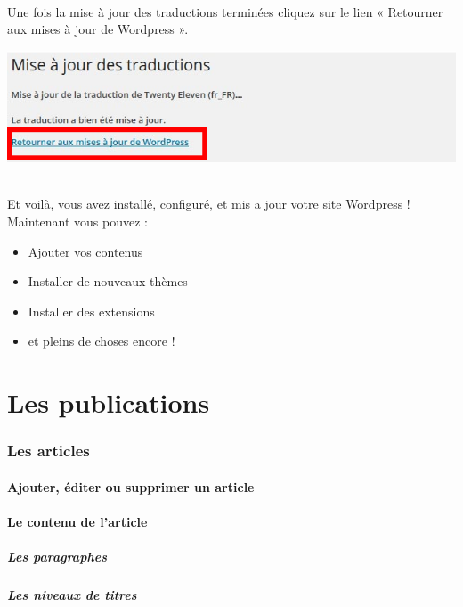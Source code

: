 \documentclass[10pt,a4paper]{article}
\begin{document}
\paragraph{}Une fois la mise à jour des traductions terminées cliquez sur le lien « Retourner aux mises à jour de Wordpress ».
\begin{center}
\includegraphics[scale=0.35]{img/0058.png}
\end{center}
\paragraph{}Et voilà, vous avez installé, configuré, et mis a jour votre site Wordpress ! Maintenant vous pouvez :
\begin{itemize}
\item Ajouter vos contenus
\item Installer de nouveaux thèmes
\item Installer des extensions
\item et pleins de choses encore !
\end{itemize}
\newpage

\part{Les publications}
\newpage

\section{Les articles}
\subsection{Ajouter, éditer ou supprimer un article}
\subsection{Le contenu de l'article}
\subsubsection{Les paragraphes}
\subsubsection{Les niveaux de titres}
\end{document}
